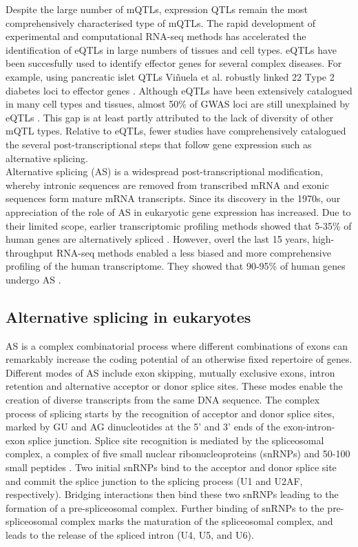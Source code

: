 Despite the large number of mQTLs, expression QTLs remain the most comprehensively characterised type of mQTLs. The rapid development of experimental and computational RNA-seq methods has accelerated the identification of eQTLs in large numbers of tissues and cell types. eQTLs have been succesfully used to identify effector genes for several complex diseases. For example, using pancreatic islet QTLs Viñuela et al. robustly linked 22 Type 2 diabetes loci to effector genes \cite{Vinuela2020-ce}. Although eQTLs have been extensively catalogued in many cell types and tissues, almost 50\% of GWAS loci are still unexplained by eQTLs \cite{Mountjoy2021-fc}. This gap is at least partly attributed to the lack of diversity of other mQTL types. Relative to eQTLs, fewer studies have comprehensively catalogued the several post-transcriptional steps that follow gene expression such as alternative splicing.\\

Alternative splicing (AS) is a widespread post-transcriptional modification, whereby intronic sequences are removed from transcribed mRNA and exonic sequences form mature mRNA transcripts. Since its discovery in the 1970s, our appreciation of the role of AS in eukaryotic gene expression has increased. Due to their limited scope, earlier transcriptomic profiling methods showed that 5-35\% of human genes are alternatively spliced \cite{Sharp1994-nz,Mironov1999-qo}. However, overl the last 15 years, high-throughput RNA-seq methods enabled a less biased and more comprehensive profiling of the human transcriptome. They showed that 90-95\% of human genes undergo AS \cite{Pan2008-qe}. 

\subsection{Alternative splicing in eukaryotes}

AS is a complex combinatorial process where different combinations of exons can remarkably increase the coding potential of an otherwise fixed repertoire of genes. Different modes of AS include exon skipping, mutually exclusive exons, intron retention and alternative acceptor or donor splice sites. These modes enable the creation of diverse transcripts from the same DNA sequence. The complex process of splicing starts by the recognition of acceptor and donor splice sites, marked by GU and AG dinucleotides at the 5' and 3' ends of the exon-intron-exon splice junction. Splice site recognition is mediated by the spliceosomal complex, a complex of five small nuclear ribonucleoproteins (snRNPs) and 50-100 small peptides \cite{Kramer1996-qj}. Two initial snRNPs bind to the acceptor and donor splice site and commit the splice junction to the splicing process (U1 and U2AF, respectively). Bridging interactions then bind these two snRNPs leading to the formation of a pre-spliceosomal complex. Further binding of snRNPs to the pre-spliceosomal complex marks the maturation of the spliceosomal complex, and leads to the release of the spliced intron (U4, U5, and U6).\\


